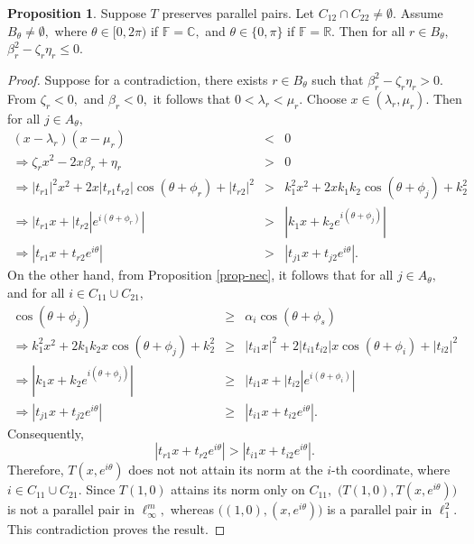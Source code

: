 \documentclass{amsart}
\theoremstyle{definition}
\newtheorem{prop}[theorem]{Proposition}
\theoremstyle{remark}
\numberwithin{equation}{section}
\begin{document}
\begin{prop}\label{prop-04}
	Suppose $T$ preserves parallel pairs. Let $C_{12}\cap C_{22}\neq \emptyset.$ Assume $B_\theta\neq \emptyset,$ where $\theta\in [0,2\pi)$ if $\mathbb{F}=\mathbb{C},$ and $\theta\in \{0,\pi\}$ if $\mathbb{F}=\mathbb{R}.$   Then for all $r\in B_\theta,$ $\beta_{r}^2-\zeta_r\eta_r\leq0.$
\end{prop}
\begin{proof}
	Suppose for a contradiction, there exists $r\in B_\theta$ such that  $\beta_{r}^2-\zeta_r\eta_r>0.$ From $\zeta_r<0,$ and $\beta_{r}<0,$ it follows that $0<\lambda_{r}<\mu_{r}.$ Choose $x\in(\lambda_{r},\mu_{r}).$ Then for all $j\in A_\theta,$ 	
	\begin{eqnarray*}
		(x-\lambda_{r})(x-\mu_{r})& <	&0\\
		\Rightarrow  \zeta_rx^2-2x\beta_{r}+\eta_r&>&0\\
		\Rightarrow  |t_{r1}|^2x^2+2x|t_{r1}t_{r2}|\cos(\theta+\phi_r)+|t_{r2}|^2&>&k_1^2x^2+2xk_1k_2\cos(\theta+\phi_j)+k_2^2\\
		\Rightarrow |t_{r1}x+|t_{r2}|e^{i(\theta+\phi_r)}|&>&|k_1x+k_2e^{i(\theta+\phi_j)}|\\
		\Rightarrow |t_{r1}x+t_{r2}e^{i\theta}|&>&|t_{j1}x+t_{j2}e^{i\theta}|.
	\end{eqnarray*}
	On the other hand, from Proposition \ref{prop-nec}, it follows that for all $j\in A_{\theta},$ and for all $i\in C_{11}\cup C_{21},$
		\begin{eqnarray*}
		\cos(\theta+\phi_j)&\geq& \alpha_i\cos(\theta+\phi_s)\\
		\Rightarrow k_1^2x^2+2k_1k_2x	\cos(\theta+\phi_j)+k_2^2&\geq& |t_{i1}x|^2+2|t_{i1}t_{i2}|x\cos(\theta+\phi_i)+|t_{i2}|^2\\
		\Rightarrow |k_1x+k_2e^{i(\theta+\phi_j)}|&\geq& |t_{i1}x+|t_{i2}|e^{i(\theta+\phi_i)}|\\
		\Rightarrow |t_{j1}x+t_{j2}e^{i\theta}|&\geq &|t_{i1}x+t_{i2}e^{i\theta}|.
	\end{eqnarray*}
	Consequently,
	\[|t_{r1}x+t_{r2}e^{i\theta}|> |t_{i1}x+t_{i2}e^{i\theta}|.\]
	Therefore, $T(x,e^{i\theta})$ does not not attain its norm at the $i$-th coordinate, where $i\in C_{11}\cup C_{21}.$ Since $T(1,0)$ attains its norm only on $C_{11},$ $\Big(T(1,0), T(x,e^{i\theta})\Big)$ is not a parallel pair in $\ell_\infty^m,$ whereas $\Big((1,0), (x,e^{i\theta})\Big)$ is a parallel pair in $\ell_1^2.$ This contradiction proves the result.
\end{proof}
\end{document}
